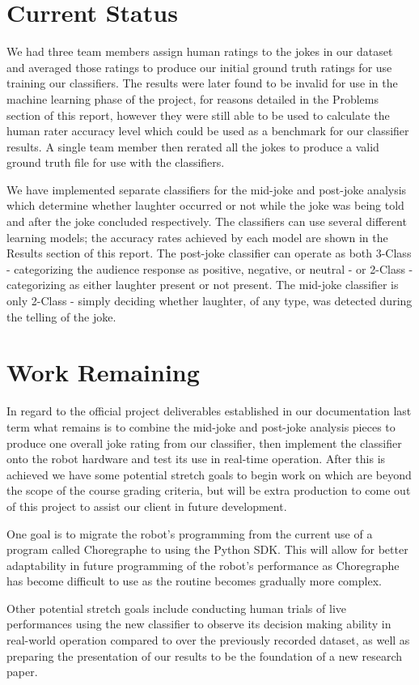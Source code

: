 \documentclass[onecolumn, draftclsnofoot,10pt, compsoc]{IEEEtran}
\begin{document}
\section{Current Status}
We had three team members assign human ratings to the jokes in our dataset and averaged those ratings to produce our initial ground truth ratings for use training our classifiers. The results were later found to be invalid for use in the machine learning phase of the project, for reasons detailed in the Problems section of this report, however they were still able to be used to calculate the human rater accuracy level which could be used as a benchmark for our classifier results. A single team member then rerated all the jokes to produce a valid ground truth file for use with the classifiers.\par
\vspace{.3cm}
\noindent We have implemented separate classifiers for the mid-joke and post-joke analysis which determine whether laughter occurred or not while the joke was being told and after the joke concluded respectively. The classifiers can use several different learning models; the accuracy rates achieved by each model are shown in the Results section of this report. The post-joke classifier can operate as both 3-Class - categorizing the audience response as positive, negative, or neutral - or 2-Class - categorizing as either laughter present or not present. The mid-joke classifier is only 2-Class - simply deciding whether laughter, of any type, was detected during the telling of the joke.

\section{Work Remaining}
In regard to the official project deliverables established in our documentation last term what remains is to combine the mid-joke and post-joke analysis pieces to produce one overall joke rating from our classifier, then implement the classifier onto the robot hardware and test its use in real-time operation. After this is achieved we have some potential stretch goals to begin work on which are beyond the scope of the course grading criteria, but will be extra production to come out of this project to assist our client in future development.\par
\vspace{.3cm}
\noindent One goal is to migrate the robot's programming from the current use of a program called Choregraphe to using the Python SDK. This will allow for better adaptability in future programming of the robot's performance as Choregraphe has become difficult to use as the routine becomes gradually more complex.\par
\vspace{.3cm}
\noindent Other potential stretch goals include conducting human trials of live performances using the new classifier to observe its decision making ability in real-world operation compared to over the previously recorded dataset, as well as preparing the presentation of our results to be the foundation of a new research paper.
\end{document}
